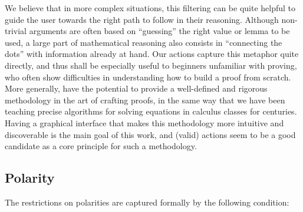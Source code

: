 We believe that in more complex situations, this filtering can be quite helpful
to guide the user towards the right path to follow in their reasoning. Although
non-trivial arguments are often based on ``guessing'' the right value or lemma
to be used, a large part of mathematical reasoning also consists in ``connecting
the dots'' with information already at hand. Our  actions capture this
metaphor quite directly, and thus shall be especially useful to beginners
unfamiliar with proving, who often show difficulties in understanding how to
build a proof from scratch. More generally,  have the potential
to provide a well-defined and rigorous methodology in the art of crafting
proofs, in the same way that we have been teaching precise algorithms for
solving equations in calculus classes for centuries. Having a graphical
interface that makes this methodology more intuitive and discoverable is the
main goal of this work, and (valid)  actions seem to be a good candidate as a
core principle for such a methodology.

\subsection{Polarity}

The restrictions on polarities are captured formally by the following condition:


